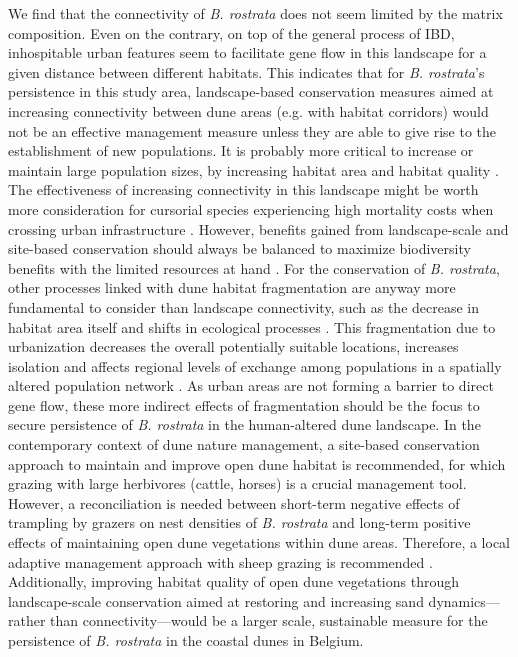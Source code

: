 \documentclass[10pt, twoside]{book} %
\begin{document}
	We find that the connectivity of \textit{B. rostrata} does not seem limited by the matrix composition. Even on the contrary, on top of the general process of IBD, inhospitable urban features seem to facilitate gene flow in this landscape for a given distance between different habitats. This indicates that for \textit{B. rostrata}'s persistence in this study area, landscape-based conservation measures aimed at increasing connectivity between dune areas (e.g. with habitat corridors) would not be an effective management measure unless they are able to give rise to the establishment of new populations. It is probably more critical to increase or maintain large population sizes, by increasing habitat area and habitat quality \citep{richardson2016, watts2016}. The effectiveness of increasing connectivity in this landscape might be worth more consideration for cursorial species experiencing high mortality costs when crossing urban infrastructure \citep[e.g., natterjack toad,][]{cox2017}. However, benefits gained from landscape-scale and site-based conservation should always be balanced to maximize biodiversity benefits with the limited resources at hand \citep{watts2016}. For the conservation of \textit{B. rostrata}, other processes linked with dune habitat fragmentation are anyway more fundamental to consider than landscape connectivity, such as the decrease in habitat area itself and shifts in ecological processes \citep[e.g. edge effects and `ecosystem decay' such as inhibition of sand dynamics in dunes;][]{pfeifer2017, chase2020}. This fragmentation due to urbanization decreases the overall potentially suitable locations, increases isolation and affects regional levels of exchange among populations in a spatially altered population network \citep{cheptou2017}. As urban areas are not forming a barrier to direct gene flow, these more indirect effects of fragmentation should be the focus to secure persistence of \textit{B. rostrata} in the human-altered dune landscape. In the contemporary context of dune nature management, a site-based conservation approach to maintain and improve open dune habitat is recommended, for which grazing with large herbivores (cattle, horses) is a crucial management tool. However, a reconciliation is needed between short-term negative effects of trampling by grazers on nest densities of \textit{B. rostrata} and long-term positive effects of maintaining open dune vegetations within dune areas. Therefore, a local adaptive management approach with sheep grazing is recommended \citep[chapter \ref{chapter3}]{bonte2005, batsleer2022a}. Additionally, improving habitat quality of open dune vegetations through landscape-scale conservation aimed at restoring and increasing sand dynamics---rather than connectivity---would be a larger scale, sustainable measure for the persistence of \textit{B. rostrata} in the coastal dunes in Belgium.\\
	
\end{document}
